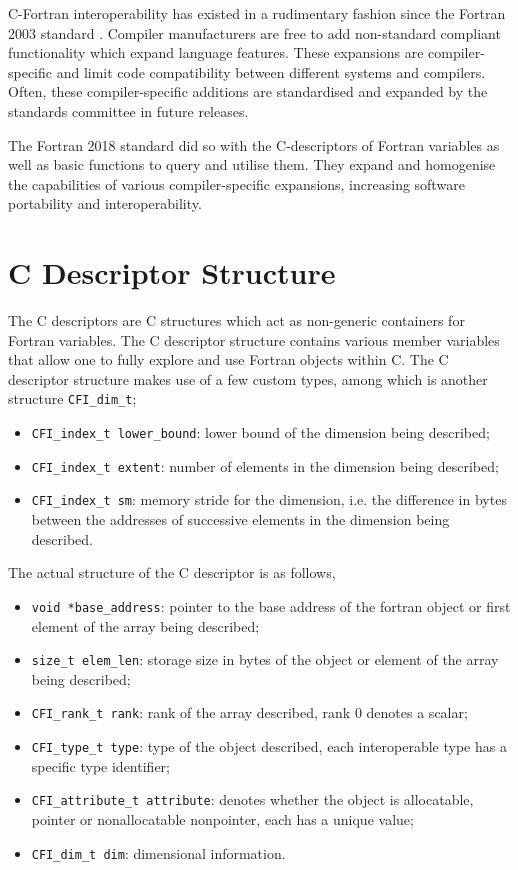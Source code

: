 C-Fortran interoperability has existed in a rudimentary fashion since the Fortran 2003 standard \cite{fortran}. Compiler manufacturers are free to add non-standard compliant functionality which expand language features. These expansions are compiler-specific and limit code compatibility between different systems and compilers. Often, these compiler-specific additions are standardised and expanded by the standards committee in future releases.

The Fortran 2018 standard did so with the C-descriptors of Fortran variables as well as basic functions to query and utilise them. They expand and homogenise the capabilities of various compiler-specific expansions, increasing software portability and interoperability.

\section{C Descriptor Structure}

The C descriptors are C structures which act as non-generic containers for Fortran variables. The C descriptor structure contains various member variables that allow one to fully explore and use Fortran objects within C. The C descriptor structure makes use of a few custom types, among which is another structure \texttt{CFI\_dim\_t};
\begin{itemize}
    \item \texttt{CFI\_index\_t lower\_bound}: lower bound of the dimension being described;
    \item \texttt{CFI\_index\_t extent}: number of elements in the dimension being described;
    \item \texttt{CFI\_index\_t sm}: memory stride for the dimension, i.e. the difference in bytes between the addresses of successive elements in the dimension being described.
\end{itemize}
The actual structure of the C descriptor is as follows,
\begin{itemize}
    \item \texttt{void *base\_address}: pointer to the base address of the fortran object or first element of the array being described;
    \item \texttt{size\_t elem\_len}: storage size in bytes of the object or element of the array being described;
    \item \texttt{CFI\_rank\_t rank}: rank of the array described, rank 0 denotes a scalar;
    \item \texttt{CFI\_type\_t type}:  type of the object described, each interoperable type has a specific type identifier;
    \item \texttt{CFI\_attribute\_t attribute}: denotes whether the object is allocatable, pointer or nonallocatable nonpointer, each has a unique value;
    \item \texttt{CFI\_dim\_t dim}: dimensional information.
\end{itemize}

